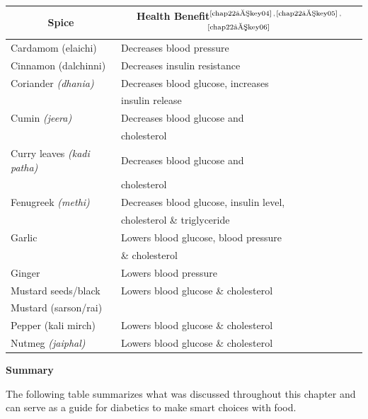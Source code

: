 \vskip 6pt
\begin{longtable}{|l|l|}
\hline
\multicolumn{1}{|c|}{\textbf{Spice}} & \multicolumn{1}{c|}{\textbf{Health Benefit}$^{\text{\cite{chap22–key04}}}$$^,$$^{\text{\cite{chap22–key05}}}$$^,$$^{\text{\cite{chap22–key06}}}$}\\
\hline
Cardamom (elaichi) & Decreases blood pressure\\
\hline
Cinnamon (dalchinni) & Decreases insulin resistance\\
\hline
Coriander \textit{(dhania)} & Decreases blood glucose, increases\\
 & insulin release\\
\hline
Cumin \textit{(jeera)} & Decreases blood glucose and\\
 & cholesterol\\
\hline
Curry leaves \textit{(kadi patha)} & Decreases blood glucose and\\
 & cholesterol\\
\hline
Fenugreek \textit{(methi)} & Decreases blood glucose, insulin level,\\
 & cholesterol \& triglyceride\\
\hline
Garlic & Lowers blood glucose, blood pressure\\
 & \& cholesterol\\
\hline
Ginger & Lowers blood pressure\\
\hline
Mustard seeds/black & Lowers blood glucose \& cholesterol\\
\hline
Mustard (sarson/rai) &\\
Pepper (kali mirch) & Lowers blood glucose \& cholesterol\\
\hline
Nutmeg \textit{(jaiphal)} & Lowers blood glucose \& cholesterol\\
\hline
\end{longtable}

\noindent\textbf{Summary}

The following table summarizes what was discussed throughout this chapter and can serve as a guide for diabetics to make smart choices with food.


